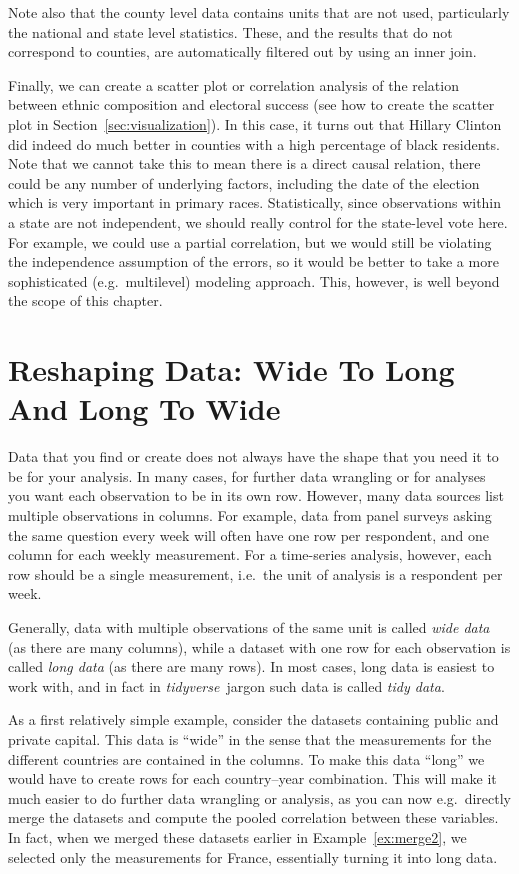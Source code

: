 Note also that the county level data contains units that are not used, particularly the national and state level statistics.
These, and the results that do not correspond to counties, are automatically filtered out by using an inner join.

Finally, we can create a scatter plot or correlation analysis of the relation between ethnic composition and electoral success (see how to create the scatter plot in Section~\ref{sec:visualization}).
In this case, it turns out that Hillary Clinton did indeed do much better in counties with a high percentage of black residents.
Note that we cannot take this to mean there is a direct causal relation, there could be any number of underlying factors, including the date of the election which is very important in primary races.
Statistically, since observations within a state are not independent, we should really control for the state-level vote here.
For example, we could use a partial correlation, but we would still be violating the independence assumption of the errors,
so it would be better to take a more sophisticated (e.g.\ multilevel) modeling approach.
This, however, is well beyond the scope of this chapter.


\section{Reshaping Data: Wide To Long And Long To Wide}\label{sec:pivot}

Data that you find or create does not always have the shape that you need it to be  for your analysis.
In many cases, for further data wrangling or for analyses you want each observation to be in its own row.
However, many data sources list multiple observations in columns.
For example, data from panel surveys asking the same question every week will often have one row per respondent,
and one column for each weekly measurement.
For a time-series analysis, however, each row should be a single measurement,
i.e.\ the unit of analysis is a respondent per week.

Generally, data with multiple observations of the same unit is called \emph{wide data} (as there are many columns),
while a dataset with one row for each observation is called \emph{long data} (as there are many rows).
In most cases, long data is easiest to work with, and in fact in \emph{tidyverse}\ jargon such data is called \emph{tidy data}.

As a first relatively simple example, consider the datasets containing public and private capital.
This data is ``wide'' in the sense that the measurements for the different countries are contained in the columns.
To make this data ``long'' we would have to create rows for each country--year combination.
This will make it much easier to do further data wrangling or analysis, as you can now e.g.\ directly merge the datasets and compute the pooled correlation between these variables.
In fact, when we merged these datasets earlier in Example~\ref{ex:merge2}, we selected only the measurements for France, essentially turning it into long data.

